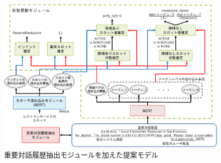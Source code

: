 \begin{figure}[htb]
  \centering
  \includegraphics[width=15cm]{chapter4/teian2.eps}
  \caption{重要対話履歴抽出モジュールを加えた提案モデル}
  \label{fig:teianmodel}
\end{figure}

